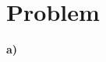 \documentclass{article}
\begin{document}


\section*{\textbf{Problem}}
\vspace*{12pt}\small\textbf{a)}
\end{document}
